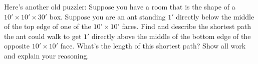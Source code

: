 \documentclass[noauthor,nooutcomes,hints,handout]{ximera}
\begin{document}
\begin{question}
  Here's another old puzzler: Suppose you have a room that is the
  shape of a $10'\times 10' \times 30'$ box. Suppose you are an ant
  standing $1'$ directly below the middle of the top edge of one of
  the $10'\times 10'$ faces.  Find and describe the shortest path the
  ant could walk to get $1'$ directly above the middle of the bottom
  edge of the opposite $10'\times10'$ face.  What's the length of this
  shortest path? Show all work and explain your reasoning.

\end{question}
\end{document}

